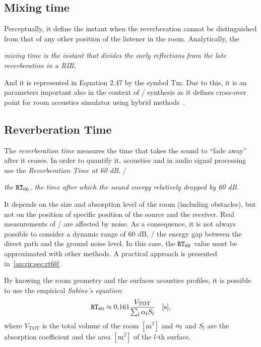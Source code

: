 \subsection{Mixing time}
Perceptually, it define the instant when the reverberation cannot be distinguished from that of any other position of the listener in the room.
Analytically,  the
\begin{center}
    \textit{\emph{mixing time} is the instant that divides the early reflections from the late reverberation in a RIR},
\end{center}
And it is represented in Equation 2.47 by the symbol Tm.
Due to this, it is an parameters important also in the context of \RIRs/ synthesis as it defines cross-over point for room acoustics simulator using hybrid methods~.

\subsection{Reverberation Time}
The \textit{reverberation time} measures the time that takes the sound to ``fade away'' after it ceases.
In order to quantify it, acoustics and in audio signal processing use the \textit{Reverberation Time at 60 dB}, \ie/
\begin{center}
    \textit{the $\mathtt{RT}_{60}$, the time after which the sound energy relatively dropped by 60 dB.}
\end{center}
It depends on the size and absorption level of the room (including obstacles), but not on the position of specific position of the source and the receiver.
Real measurements of \RIRs/ are affected by noise.
As a consequence, it is not always possible to consider a dynamic range of 60 dB,
\ie/ the energy gap between the direct path and the ground noise level.
In this case, the $\mathtt{RT}_{60}$ value must be approximated with other methods.
A practical approach is presented in~\cref{ap:rir:sec:rt60}.

By knowing the room geometry and the surfaces acoustics profiles,
it is possible to use the empirical \textit{Sabine's equation}:
\begin{equation}
    \mathtt{RT}_{60}
    \approx 0.161 \frac{V_{\text{TOT}}}{\sum_l \alpha_l S_l} \hspace{1em} [\si{\second}]
    ,
\end{equation}
where $V_{\text{TOT}}$ is the total volume of the room $[\si{\metre^3}]$ and $\alpha_l$ and $S_l$ are the
absorption coefficient and the area $[\si{\metre^2}]$  of the $l$-th surface.

